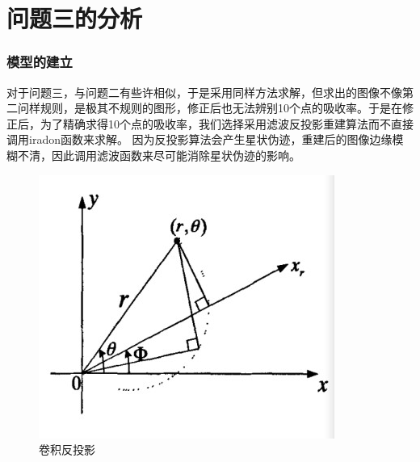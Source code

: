 \documentclass[withoutpreface,bwprint]{cumcmthesis} %
\begin{document}
\section{问题三的分析}
\subsubsection {模型的建立}
对于问题三，与问题二有些许相似，于是采用同样方法求解，但求出的图像不像第二问样规则，是极其不规则的图形，修正后也无法辨别10个点的吸收率。于是在修正后，为了精确求得10个点的吸收率，我们选择采用滤波反投影重建算法而不直接调用iradon函数来求解。
因为反投影算法会产生星状伪迹，重建后的图像边缘模糊不清，因此调用滤波函数来尽可能消除星状伪迹的影响。

\begin{figure}[H]
\centering
\includegraphics[width=.6\textwidth]{5.png}
\caption{卷积反投影}
\end{figure}
\end{document}
